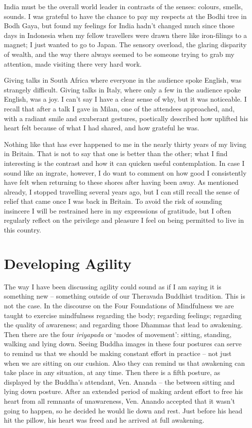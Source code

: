 India must be the overall world leader in contrasts of the senses:
colours, smells, sounds. I was grateful to have the chance to pay my
respects at the Bodhi tree in Bodh Gaya, but found my feelings for India
hadn't changed much since those days in Indonesia when my fellow
travellers were drawn there like iron-filings to a magnet; I just wanted
to go to Japan. The sensory overload, the glaring disparity of wealth,
and the way there always seemed to be someone trying to grab my
attention, made visiting there very hard work.

Giving talks in South Africa where everyone in the audience spoke
English, was strangely difficult. Giving talks in Italy, where only a
few in the audience spoke English, was a joy. I can't say I have a clear
sense of why, but it was noticeable. I recall that after a talk I gave
in Milan, one of the attendees approached, and, with a radiant smile and
exuberant gestures, poetically described how uplifted his heart felt
because of what I had shared, and how grateful he was.

Nothing like that has ever happened to me in the nearly thirty years of
my living in Britain. That is not to say that one is better than the
other; what I find interesting is the contrast and how it can quicken
useful contemplation. In case I sound like an ingrate, however, I do
want to comment on how good I consistently have felt when returning to
these shores after having been away. As mentioned already, I stopped
travelling several years ago, but I can still recall the sense of relief
that came once I was back in Britain. To avoid the risk of sounding
insincere I will be restrained here in my expressions of gratitude, but
I often regularly reflect on the privilege and pleasure I feel on being
permitted to live in this country.

\section{Developing Agility}

The way I have been discussing agility could sound as if I am saying it
is something new -- something outside of our Theravada Buddhist
tradition. This is not the case. In the discourse on the Four
Foundations of Mindfulness we are taught to exercise mindfulness
regarding the body; regarding feelings; regarding the quality of
awareness; and regarding those Dhammas that lead to awakening. Then
there are the four \emph{iriyapada} or `modes of movement': sitting,
standing, walking and lying down. Seeing Buddha images in these four
postures can serve to remind us that we should be making constant effort
in practice -- not just when we are sitting on our cushion. Also they
can remind us that awakening can take place in any situation, at any
time. Then there is a fifth posture, as displayed by the Buddha's
attendant, Ven. Ananda -- the between sitting and lying down posture.
After an extended period of making ardent effort to free his heart from
all remnants of unawareness, Ven. Anando accepted that it wasn't going
to happen, so he decided he would lie down and rest. Just before his
head hit the pillow, his heart was freed and he arrived at full
awakening.

